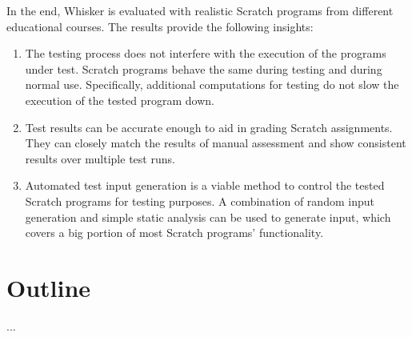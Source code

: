 In the end, Whisker is evaluated with realistic Scratch programs from different educational courses.
The results provide the following insights:

\begin{enumerate}[(1)]
    \item The testing process does not interfere with the execution of the programs under test.
        Scratch programs behave the same during testing and during normal use.
        Specifically, additional computations for testing do not slow the execution of the tested program down.
    \item Test results can be accurate enough to aid in grading Scratch assignments.
        They can closely match the results of manual assessment and show consistent results over multiple test runs.
    \item Automated test input generation is a viable method to control the tested Scratch programs for testing purposes.
        A combination of random input generation and simple static analysis can be used to generate input, which covers a big portion of most Scratch programs' functionality.
\end{enumerate}

\section{Outline}
...

%
